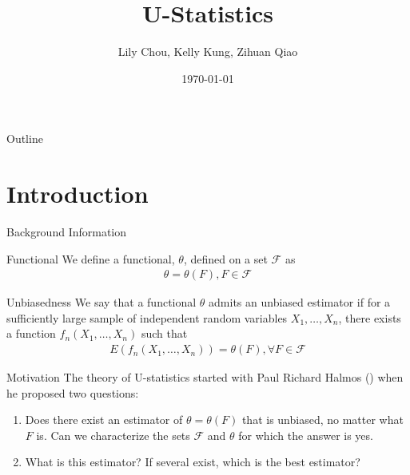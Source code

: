 \documentclass{beamer}
\title{U-Statistics}
\author{Lily Chou, Kelly Kung, Zihuan Qiao}
\institute{Probability Theory II}
\date{\today}
\begin{document}
\begin{frame}
  \titlepage
\end{frame}

\begin{frame}{Outline}
  \tableofcontents
\end{frame}

\section{Introduction}
\begin{frame}{Background Information}
    \begin{block}{Functional}
    We define a functional, $\theta$, defined on a set $\mathcal{F}$ as 
    \begin{align}
        \theta = \theta(F), F \in \mathcal{F}
    \end{align}
    \end{block}
    \begin{block}{Unbiasedness}
    We say that a functional $\theta$ admits an unbiased estimator if for a sufficiently large sample of independent random variables $X_1, \dotsc, X_n$, there exists a function $f_n(X_1, \dotsc, X_n)$ such that 
    \begin{align}\label{unbiased}
        E(f_n(X_1, \dotsc, X_n)) = \theta(F), \forall F \in \mathcal{F}
    \end{align}
    \end{block}
\end{frame}
\begin{frame}{Motivation}
The theory of U-statistics started with Paul Richard Halmos (\cite{halmos1946theory}) when he proposed two questions:
\begin{enumerate}
        \item Does there exist an estimator of $\theta = \theta(F)$ that is unbiased, no matter what $F$ is. Can we characterize the sets $\mathcal{F}$ and $\theta$ for which the answer is yes.
        
        \item What is this estimator? If several exist, which is the best estimator?
\end{enumerate}
\end{frame}
\end{document}
